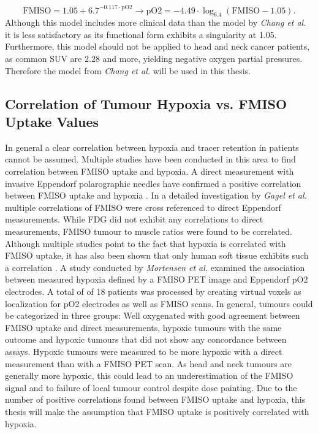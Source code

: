 \begin{equation}
\mathrm{FMISO} = 1.05 + 6.7^{-0.117\cdot \mathrm{pO2}}\rightarrow \mathrm{pO2} = -4.49\cdot \log_{6.4}(\mathrm{FMISO - 1.05}).
\end{equation}
Although this model includes more clinical data than the model by \textit{Chang et al.} \cite{pmid19994538} it is less satisfactory as its functional form exhibits a singularity at 1.05. Furthermore, this model should not be applied to head and neck cancer patients, as common SUV are $2.28$ and more, yielding negative oxygen partial pressures. Therefore the model from \textit{Chang et al.}\cite{pmid19994538} will be used in this thesis.
\subsection{Correlation of Tumour Hypoxia vs. FMISO Uptake Values}\label{chap:hypoxiacorrelation}
In general a clear correlation between hypoxia and tracer retention in patients cannot be assumed. Multiple studies have been conducted in this area to find correlation between FMISO uptake and hypoxia. A direct measurement with invasive Eppendorf polarographic needles have confirmed a positive correlation between FMISO uptake and hypoxia \cite{pmid16104907, pmid16841141, pmid17598907, pmid15480509, pmid8892467}. In a detailed investigation by \textit{Gagel et al.} \cite{pmid17598907} multiple correlations of FMISO were cross referenced to direct Eppendorf measurements. While FDG did not exhibit any correlations to direct measurements, FMISO tumour to muscle ratios were found to be correlated. Although multiple studies point to the fact that hypoxia is correlated with FMISO uptake, it has also been shown that only human soft tissue exhibits such a correlation \cite{pmid12865184}. A study conducted by \textit{Mortensen et al.} \cite{pmid20831480} examined the association between measured hypoxia defined by a FMISO PET image and Eppendorf pO2 electrodes.  A total of of 18 patients was processed by creating virtual voxels as localization for pO2 electrodes as well as FMISO scans. In general, tumours could be categorized in three groups: Well oxygenated with good agreement between FMISO uptake and direct measurements, hypoxic tumours with the same outcome and hypoxic tumours that did not show any concordance between assays. Hypoxic tumours were measured to be more hypoxic with a direct measurement than with a FMISO PET scan. As head and neck tumours are generally more hypoxic, this could lead to an underestimation of the FMISO signal and to failure of local tumour control  despite dose painting. Due to the number of positive correlations found between FMISO uptake and hypoxia, this thesis will make the assumption that FMISO uptake is positively correlated with hypoxia.
